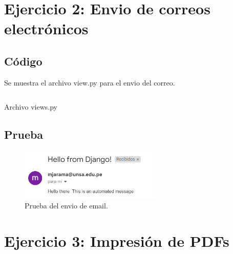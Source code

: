 \documentclass{article}
\newenvironment{block}{\captionsetup{type=listing}}{}
\begin{document}
\section{Ejercicio 2: Envio de correos electrónicos}
\subsection{Código}
Se muestra el archivo view.py para el envio del correo.
\begin{block}
	\inputminted{python}{../email_example/send_email/views.py}
	\caption{Archivo views.py}
\end{block}
\subsection{Prueba}

\begin{figure}[H]
	\centering
	\includegraphics[width=0.6\textwidth,keepaspectratio]{img/send_email.png}
	\caption{Prueba del envio de email.}
\end{figure}

\section{Ejercicio 3: Impresión de PDFs}
\end{document}
